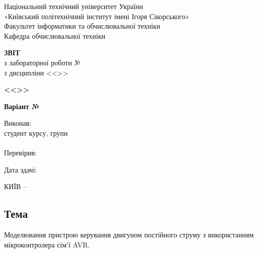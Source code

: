 \documentclass[14pt, a4paper]{extreport}
\begin{document}
	
	\begin{titlepage}
		\begin{center}
			\normalsize
			Національний технічний університет України\\
			«Київський політехнічний інститут імені Ігоря Сікорського» \\[0.5em]
			Факультет інформатики та обчислювальної техніки\\
			Кафедра обчислювальної техніки
			
			\vfill
			
			{\large \textbf{ЗВІТ}\\[0.5em]}
			{з лабораторної роботи №\LabNumber \\}
			{з дисципліни <<\CourseTitle>>}
			
			\vspace{2em}
			
			{\textbf{<<\Topic>>}}
			
			\vspace{1em}
			
			{\textbf{Варіант №\Variant}}
			
			\vfill
			
			\begin{flushright}
				Виконав: \\ студент \CourseNumber{} курсу, групи \StudentGroup \\
				\StudentName \\[1em]
				Перевірив: \\ \Teacher
			\end{flushright}
			
			\vfill
			
			\begin{flushright}
				Дата здачі: \DTMtoday
			\end{flushright}
			
			\vspace{5em}
			КИЇВ -- \ReportYear
		\end{center}
	\end{titlepage}
	
	\clearpage
	\setcounter{page}{2}
	
	\subsection*{Тема} 
	Моделювання пристрою керування двигуном постійного струму з використанням мікроконтролера сім’ї AVR.
	
\end{document}
